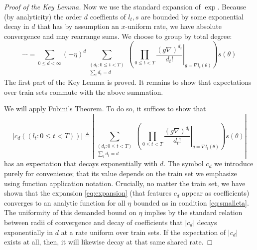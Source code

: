 \documentclass[anon,12pt]{colt2021} %
\newcommand{\wrap}[1]{\left(#1\right)}
\newcommand{\wabs}[1]{\left|#1\right|}
\begin{document}
{\begin{proof}[Proof of the Key Lemma]
            Now we use the standard expansion of $\exp$.  Because (by
            analyticity) the order $d$ coeffients of $l_t, s$ are bounded by
            some exponential decay in $d$ that has by assumption an $x$-uniform
            rate, we have absolute convergence and may rearrange sums.  We
            choose to group by total degree:
            \begin{equation} \label{eq:expansion}
                \cdots 
                =
                \sum_{0\leq d < \infty} (-\eta)^d
                \sum_{\substack{(d_t: 0\leq t<T) \\ \sum_t d_t = d}}
                \wrap{
                    \prod_{0 \leq t < T} \left.
                        \frac{(g \nabla)^{d_t}}{d_t!}
                    \right|_{g=\nabla l_t(\theta)}
                } s (\theta)
            \end{equation}
            The first part of the Key Lemma is proved.  It remains to show that
            expectations over train sets commute with the above summation.

            We will apply Fubini's Theorem.  To do so, it suffices to show that   
            $$
                \wabs{c_d((l_t: 0\leq t<T))} 
                \triangleq
                \wabs{
                    \sum_{\substack{(d_t: 0\leq t<T) \\ \sum_t d_t = d}}
                    \wrap{
                        \prod_{0 \leq t < T} \left.
                            \frac{(g \nabla)^{d_t}}{d_t!}
                        \right|_{g=\nabla l_t(\theta)}
                    } s (\theta)
                }
            $$
            has an expectation that decays exponentially with $d$.  The symbol
            $c_d$ we introduce purely for convenience; that its value depends
            on the train set we emphasize using function application
            notation.  Crucially, no matter the train set, we have shown
            that the expansion \ref{eq:expansion} (that features $c_d$ appear
            as coefficients) converges to an analytic function for all $\eta$
            bounded as in condition \ref{eq:smalleta}.  The uniformity of this
            demanded bound on $\eta$ implies by the standard relation between
            radii of convergence and decay of coefficients that $\wabs{c_d}$
            decays exponentially in $d$ at a rate uniform over train sets.
            If the expectation of $\wabs{c_d}$ exists at all, then, it will
            likewise decay at that same shared rate.
            

\end{proof}}
\end{document}
